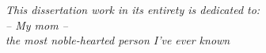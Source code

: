 \begin{center}
\vspace*{7cm}
\emph{This dissertation work in its entirety is dedicated to:\\ -- My mom -- \\the most noble-hearted person I've ever known}
\end{center}
